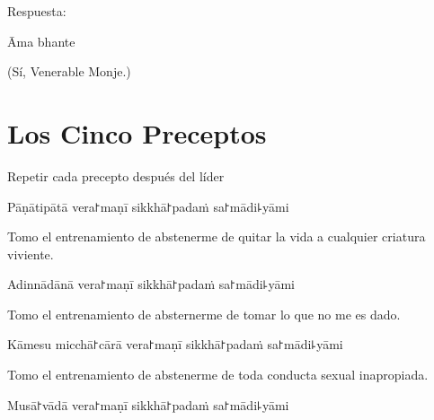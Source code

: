\begin{instruction}
  Respuesta:
\end{instruction}

Āma bhante

\begin{english}
  (Sí, Venerable Monje.)
\end{english}

\chapter{Los Cinco Preceptos}

\begin{instruction}
  Repetir cada precepto después del líder
\end{instruction}

\begin{precept}
  \setcounter{enumi}{0}
  \item Pāṇātipātā vera꜓maṇī sikkhā꜓padaṁ sa꜓mādi꜕yāmi
\end{precept}

\begin{english}
  Tomo el entrenamiento de abstenerme de quitar la vida a cualquier criatura viviente.
\end{english}

\begin{precept}
  \setcounter{enumi}{1}
  \item Adinnādānā vera꜓maṇī sikkhā꜓padaṁ sa꜓mādi꜕yāmi
\end{precept}

\begin{english}
  Tomo el entrenamiento de absternerme de tomar lo que no me es dado.
\end{english}

\begin{precept}
  \setcounter{enumi}{2}
  \item Kāmesu micchā꜓cārā vera꜓maṇī sikkhā꜓padaṁ sa꜓mādi꜕yāmi
\end{precept}

\begin{english}
  Tomo el entrenamiento de abstenerme de toda conducta sexual inapropiada.
\end{english}

\begin{precept}
  \setcounter{enumi}{3}
  \item Musā꜓vādā vera꜓maṇī sikkhā꜓padaṁ sa꜓mādi꜕yāmi
\end{precept}

